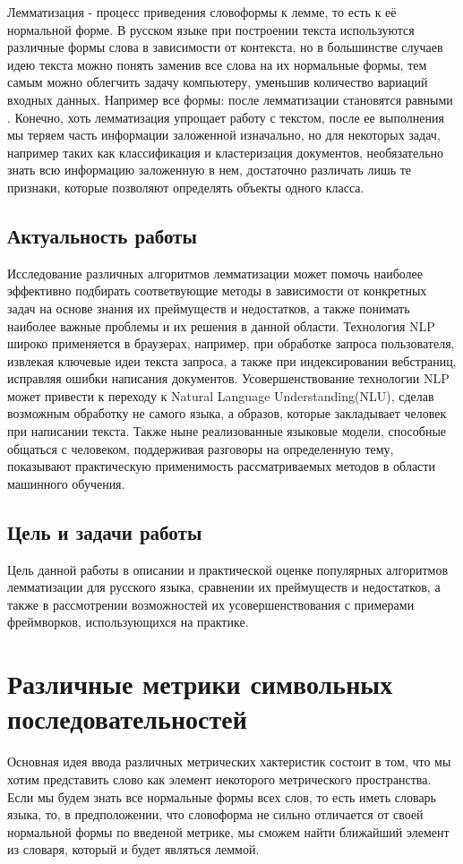 \documentclass[12pt, a4paper]{article}
\begin{document}
Лемматизация - процесс приведения словоформы к лемме, то есть к её нормальной форме. В русском языке при построении текста используются различные формы слова в зависимости от контекста, но в большинстве случаев идею текста можно понять заменив все слова на их нормальные формы, тем самым можно облегчить задачу компьютеру, уменьшив количество вариаций входных данных. Например все формы:  после лемматизации становятся равными . Конечно, хоть лемматизация упрощает работу с текстом, после ее выполнения мы теряем часть информации заложенной изначально, но для некоторых задач, например таких как классификация и кластеризация документов, необязательно знать всю информацию заложенную в нем, достаточно различать лишь те признаки, которые позволяют определять объекты одного класса.

\subsection{Актуальность работы}
\quad Исследование различных алгоритмов лемматизации может помочь наиболее эффективно подбирать соответвующие методы в зависимости от конкретных задач на основе знания их преймуществ и недостатков, а также понимать наиболее важные проблемы и их решения в данной области. Технология NLP широко применяется в браузерах, например, при обработке запроса пользователя, извлекая ключевые идеи текста запроса, а также при индексировании вебстраниц, исправляя ошибки написания документов. Усовершенствование технологии NLP может привести к переходу к Natural Language Understanding(NLU), сделав возможным обработку не самого языка, а образов, которые закладывает человек при написании текста. 
Также ныне реализованные языковые модели, способные общаться с человеком, поддерживая разговоры на определенную тему, показывают практическую применимость рассматриваемых методов в области машинного обучения.

\subsection{Цель и задачи работы}
\quad Цель данной работы в описании и практической оценке популярных алгоритмов лемматизации для русского языка, сравнении их преймуществ и недостатков, а также в рассмотрении возможностей их усовершенствования с примерами фреймворков, использующихся на практике.

\section{Различные метрики символьных последовательностей}
\quad Основная идея ввода различных метрических хактеристик состоит в том, что мы хотим представить слово как элемент некоторого метрического пространства. Если мы будем знать все нормальные формы всех слов, то есть иметь словарь языка, то, в предположении, что словоформа не сильно отличается от своей нормальной формы по введеной метрике, мы сможем найти ближайший элемент из словаря, который и будет являться леммой.
\end{document}
